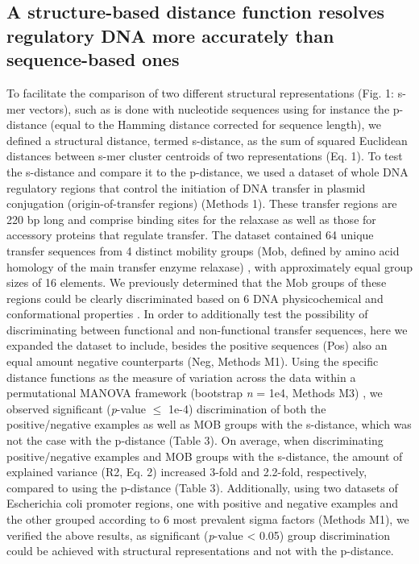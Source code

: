\documentclass[sigconf]{acmart}
\begin{document}
\subsection{A structure-based distance function resolves regulatory DNA more accurately than sequence-based ones}
To facilitate the comparison of two different structural representations (Fig. 1: s-mer vectors), such as is done with nucleotide sequences using for instance the p-distance (equal to the Hamming distance corrected for sequence length), we defined a structural distance, termed s-distance, as the sum of squared Euclidean distances between s-mer cluster centroids of two representations (Eq. 1). To test the s-distance and compare it to the p-distance, we used a dataset of whole DNA regulatory regions that control the initiation of DNA transfer in plasmid conjugation (origin-of-transfer regions) \cite{De_La_Cruz2010-xj} (Methods 1). These transfer regions are 220 bp long and comprise binding sites for the relaxase as well as those for accessory proteins that regulate transfer. The dataset contained 64 unique transfer sequences \cite{Zrimec2018-lx} from 4 distinct mobility groups (Mob, defined by amino acid homology of the main transfer enzyme relaxase) \cite{Garcillan-Barcia2009-yk}, with approximately equal group sizes of 16 elements. We previously determined that the Mob groups of these regions could be clearly discriminated based on 6 DNA physicochemical and conformational properties \cite{Zrimec2018-lx}. In order to additionally test the possibility of discriminating between functional and non-functional transfer sequences, here we expanded the dataset to include, besides the positive sequences (Pos) also an equal amount negative counterparts (Neg, Methods M1). Using the specific distance functions as the measure of variation across the data within a permutational MANOVA framework (bootstrap \textit{n} = 1e4, Methods M3) \cite{Anderson2005-pu}, we observed significant (\textit{p}-value \(\leq\) 1e-4) discrimination of both the positive/negative examples as well as MOB groups with the s-distance, which was not the case with the p-distance (Table 3). On average, when discriminating positive/negative examples and MOB groups with the s-distance, the amount of explained variance (R2, Eq. 2) increased 3-fold and 2.2-fold, respectively, compared to using the p-distance (Table 3). Additionally, using two datasets of Escherichia coli promoter regions, one with positive and negative examples \cite{Gusmao2014-hp} and the other grouped according to 6 most prevalent sigma factors \cite{Gama-Castro2016-so} (Methods M1), we verified the above results, as significant (\textit{p}-value < 0.05) group discrimination could be achieved with structural representations and not with the p-distance.
\end{document}
